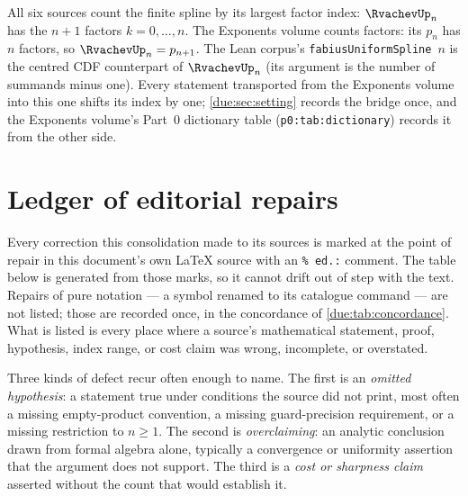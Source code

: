 \documentclass[11pt,oneside]{article}
\theoremstyle{plain}
\theoremstyle{definition}
\theoremstyle{remark}
\newcommand{\upn}[1]{\RvachevUp_{#1}}
\begin{document}
\begin{warningbox}[title={Index conventions that do not agree across the corpus}]
\label{due:rmk:notation-indexing}
All six sources count the finite spline by its largest factor index:
\(\upn{n}\) has the \(n+1\) factors \(k=0,\ldots,n\).  The Exponents volume
counts factors: its \(p_{n}\) has \(n\) factors, so \(\upn{n}=p_{n+1}\).  The
Lean corpus's \texttt{fabiusUniformSpline}~\(n\) is the centred CDF
counterpart of \(\upn{n}\) (its argument is the number of summands minus
one).  Every statement transported from the Exponents volume into this one
shifts its index by one; \cref{due:sec:setting} records the bridge once, and
the Exponents volume's Part~0 dictionary table (\texttt{p0:tab:dictionary})
records it from the other side.
\end{warningbox}

\section{Ledger of editorial repairs}
\label{due:sec:repairs}

Every correction this consolidation made to its sources is marked at the
point of repair in this document's own \LaTeX{} source with an
\texttt{\%~ed.:} comment.  The table below is generated from those marks, so it
cannot drift out of step with the text.  Repairs of pure notation --- a
symbol renamed to its catalogue command --- are not listed; those are recorded
once, in the concordance of \cref{due:tab:concordance}.  What is listed is
every place where a source's mathematical statement, proof, hypothesis, index
range, or cost claim was wrong, incomplete, or overstated.

Three kinds of defect recur often enough to name.  The first is an
\emph{omitted hypothesis}: a statement true under conditions the source did not
print, most often a missing empty-product convention, a missing guard-precision
requirement, or a missing restriction to \(n\ge1\).  The second is
\emph{overclaiming}: an analytic conclusion drawn from formal algebra alone,
typically a convergence or uniformity assertion that the argument does not
support.  The third is a \emph{cost or sharpness claim} asserted without the
count that would establish it.
\end{document}

